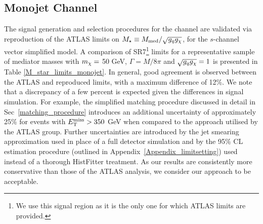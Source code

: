 \subsection{Monojet Channel}
\label{monojet_validation}
The signal generation and selection procedures for the \monojet channel are validated via reproduction of the ATLAS limits on $M_{\star} \equiv M_{\mathrm{med}} / \sqrt{g_q g_{\chi}}$, for the $s$-channel vector simplified model. A comparison of SR7\footnote{We use this signal region as it is the only one for which ATLAS limits are provided.} limits for a representative sample of mediator masses with $m_{\chi} = $ 50 GeV, $\Gamma = M/8\pi$ and $\sqrt{g_q g_{\chi}} = 1$ is presented in Table \ref{M_star_limits_monojet}. In general, good agreement is observed between the ATLAS and reproduced limits, with a maximum difference of 12\%. We note that a discrepancy of a few percent is expected given the differences in signal simulation. For example, the simplified matching procedure discussed in detail in Sec~\ref{matching_procedure} introduces an additional uncertainty of approximately 25\% for events with $E_{\mathrm{T}}^{\mathrm{miss}} > 350$ GeV when compared to the approach utilised by the ATLAS \monojet group. Further uncertainties are introduced by the jet smearing approximation used in place of a full detector simulation and by the 95\% CL estimation procedure (outlined in Appendix~\ref{Appendix_limitsetting}) used instead of a thorough HistFitter treatment. As our results are consistently more conservative than those of the ATLAS analysis, we consider our approach to be acceptable.
%
%
